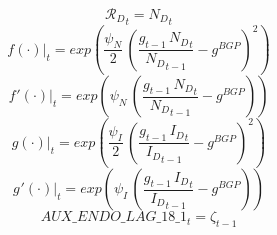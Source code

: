 \documentclass[10pt,a4paper]{article}
\begin{document}
\begin{dmath}
{\mathcal{R}_{D}}_{t}={N_D}_{t}
\end{dmath}
\begin{dmath}
{\left.       f\left( \cdot \right)            \right|}_{t}=exp\left(\frac{\psi_N}{2}\, \left(\frac{{g}_{t-1}\, {N_D}_{t}}{{N_D}_{t-1}}-g^{BGP}\right)^{2}\right)
\end{dmath}
\begin{dmath}
{\left.       f^‎{\prime}\left( \cdot \right)   \right|}_{t}=exp\left(\psi_N\, \left(\frac{{g}_{t-1}\, {N_D}_{t}}{{N_D}_{t-1}}-g^{BGP}\right)\right)
\end{dmath}
\begin{dmath}
{\left.       g\left( \cdot \right)            \right|}_{t}=exp\left(\frac{\psi_I}{2}\, \left(\frac{{g}_{t-1}\, {I_D}_{t}}{{I_D}_{t-1}}-g^{BGP}\right)^{2}\right)
\end{dmath}
\begin{dmath}
{\left.       g^‎{\prime}\left( \cdot \right)   \right|}_{t}=exp\left(\psi_I\, \left(\frac{{g}_{t-1}\, {I_D}_{t}}{{I_D}_{t-1}}-g^{BGP}\right)\right)
\end{dmath}
\begin{dmath}
AUX\_ENDO\_LAG\_18\_1_{t}={\zeta}_{t-1}
\end{dmath}
\end{document}
